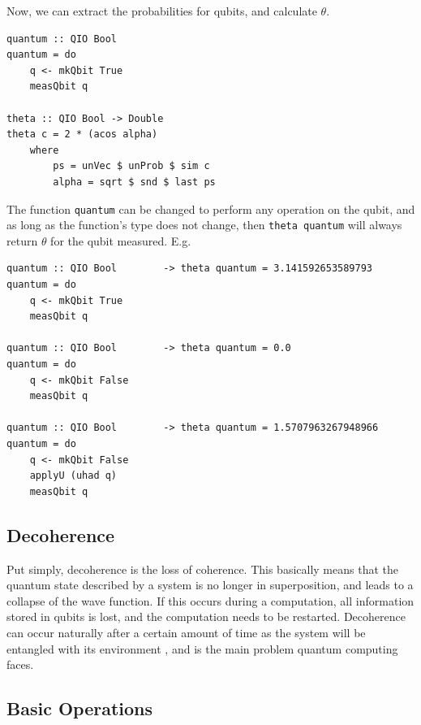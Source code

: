 \documentclass[a4paper,11pt, titlepage, twoside]{article}
\begin{document}
Now, we can extract the probabilities for qubits, and calculate $\theta$.
\begin{verbatim}
quantum :: QIO Bool
quantum = do
    q <- mkQbit True
    measQbit q
    
theta :: QIO Bool -> Double
theta c = 2 * (acos alpha)
    where
        ps = unVec $ unProb $ sim c
        alpha = sqrt $ snd $ last ps
\end{verbatim}
The function \texttt{quantum} can be changed to perform any operation on the qubit, and as long as the function's type does not change, then \texttt{theta quantum} will always return $\theta$ for the qubit measured. E.g.
\begin{verbatim}
quantum :: QIO Bool        -> theta quantum = 3.141592653589793
quantum = do
    q <- mkQbit True
    measQbit q

quantum :: QIO Bool        -> theta quantum = 0.0
quantum = do
    q <- mkQbit False
    measQbit q

quantum :: QIO Bool        -> theta quantum = 1.5707963267948966
quantum = do
    q <- mkQbit False
    applyU (uhad q)
    measQbit q
\end{verbatim}

\subsection{Decoherence}
Put simply, decoherence is the loss of coherence. This basically means that the quantum state described by a system is no longer in superposition, and leads to a collapse of the wave function. If this occurs during a computation, all information stored in qubits is lost, and the computation needs to be restarted. Decoherence can occur naturally after a certain amount of time as the system will be entangled with its environment \cite{decoherence}, and is the main problem quantum computing faces.

\subsection{Basic Operations}
\end{document}
